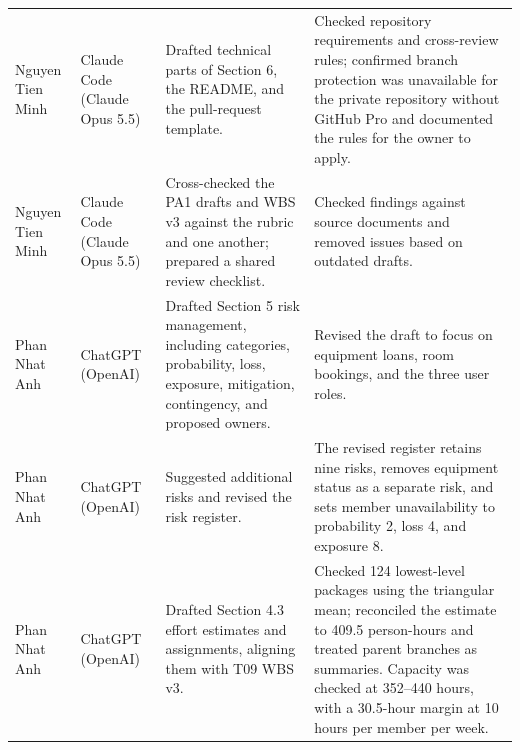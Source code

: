 \documentclass[11pt]{article}
\begin{document}
\begin{longtable}{@{}L{2.8cm}L{2.0cm}L{5.0cm}L{5.8cm}@{}}
Nguyen Tien Minh & Claude Code (Claude Opus 5.5) & Drafted technical parts of Section 6, the README, and the pull-request template. & Checked repository requirements and cross-review rules; confirmed branch protection was unavailable for the private repository without GitHub Pro and documented the rules for the owner to apply. \\
Nguyen Tien Minh & Claude Code (Claude Opus 5.5) & Cross-checked the PA1 drafts and WBS v3 against the rubric and one another; prepared a shared review checklist. & Checked findings against source documents and removed issues based on outdated drafts. \\
Phan Nhat Anh & ChatGPT (OpenAI) & Drafted Section 5 risk management, including categories, probability, loss, exposure, mitigation, contingency, and proposed owners. & Revised the draft to focus on equipment loans, room bookings, and the three user roles. \\
Phan Nhat Anh & ChatGPT (OpenAI) & Suggested additional risks and revised the risk register. & The revised register retains nine risks, removes equipment status as a separate risk, and sets member unavailability to probability 2, loss 4, and exposure 8. \\
Phan Nhat Anh & ChatGPT (OpenAI) & Drafted Section 4.3 effort estimates and assignments, aligning them with T09 WBS v3. & Checked 124 lowest-level packages using the triangular mean; reconciled the estimate to 409.5 person-hours and treated parent branches as summaries. Capacity was checked at 352--440 hours, with a 30.5-hour margin at 10 hours per member per week. \\
\bottomrule
\end{longtable}
\normalsize
\end{document}
